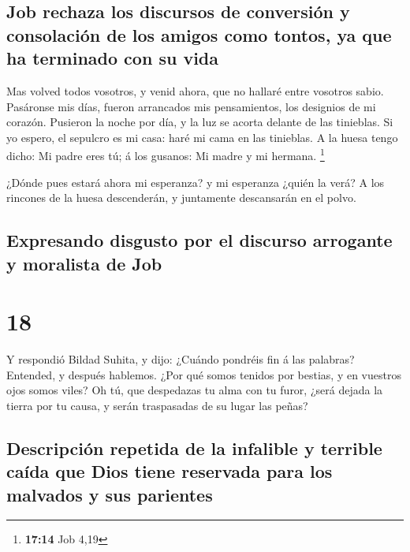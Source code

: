 \hypertarget{job-rechaza-los-discursos-de-conversiuxf3n-y-consolaciuxf3n-de-los-amigos-como-tontos-ya-que-ha-terminado-con-su-vida}{%
\subsection{Job rechaza los discursos de conversión y consolación de los
amigos como tontos, ya que ha terminado con su
vida}\label{job-rechaza-los-discursos-de-conversiuxf3n-y-consolaciuxf3n-de-los-amigos-como-tontos-ya-que-ha-terminado-con-su-vida}}

 Mas volved todos vosotros, y venid ahora, que no hallaré
entre vosotros sabio.  Pasáronse mis días, fueron
arrancados mis pensamientos, los designios de mi corazón. 
Pusieron la noche por día, y la luz se acorta delante de las tinieblas.
 Si yo espero, el sepulcro es mi casa: haré mi cama en las
tinieblas.  A la huesa tengo dicho: Mi padre eres tú; á los
gusanos: Mi madre y mi hermana. \footnote{\textbf{17:14} Job 4,19}

 ¿Dónde pues estará ahora mi esperanza? y mi esperanza
¿quién la verá?  A los rincones de la huesa descenderán, y
juntamente descansarán en el polvo.

\hypertarget{expresando-disgusto-por-el-discurso-arrogante-y-moralista-de-job}{%
\subsection{Expresando disgusto por el discurso arrogante y moralista de
Job}\label{expresando-disgusto-por-el-discurso-arrogante-y-moralista-de-job}}

\hypertarget{section-17}{%
\section{18}\label{section-17}}

 Y respondió Bildad Suhita, y dijo:  ¿Cuándo
pondréis fin á las palabras? Entended, y después hablemos. 
¿Por qué somos tenidos por bestias, y en vuestros ojos somos viles?
 Oh tú, que despedazas tu alma con tu furor, ¿será dejada la
tierra por tu causa, y serán traspasadas de su lugar las peñas?

\hypertarget{descripciuxf3n-repetida-de-la-infalible-y-terrible-cauxedda-que-dios-tiene-reservada-para-los-malvados-y-sus-parientes}{%
\subsection{Descripción repetida de la infalible y terrible caída que
Dios tiene reservada para los malvados y sus
parientes}\label{descripciuxf3n-repetida-de-la-infalible-y-terrible-cauxedda-que-dios-tiene-reservada-para-los-malvados-y-sus-parientes}}

